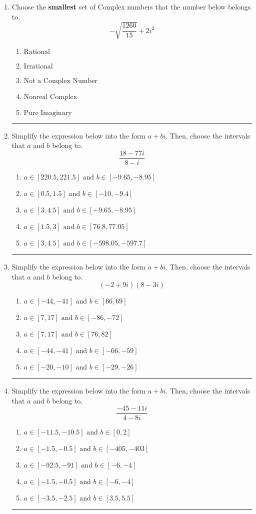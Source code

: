 \documentclass[14pt]{extbook}
\newcommand{\litem}[1]{\item#1\hspace*{-1cm}\rule{\textwidth}{0.4pt}}
\begin{document}
\begin{enumerate}
{\begin{enumerate}[label=\Alph*.]
\end{enumerate} }
\litem{
Choose the \textbf{smallest} set of Complex numbers that the number below belongs to.\[ -\sqrt{\frac{1260}{15}}+2i^2 \]\begin{enumerate}[label=\Alph*.]
\item \( \text{Rational} \)
\item \( \text{Irrational} \)
\item \( \text{Not a Complex Number} \)
\item \( \text{Nonreal Complex} \)
\item \( \text{Pure Imaginary} \)

\end{enumerate} }
\litem{
Simplify the expression below into the form $a+bi$. Then, choose the intervals that $a$ and $b$ belong to.\[ \frac{18 - 77 i}{8 - i} \]\begin{enumerate}[label=\Alph*.]
\item \( a \in [220.5, 221.5] \text{ and } b \in [-9.65, -8.95] \)
\item \( a \in [0.5, 1.5] \text{ and } b \in [-10, -9.4] \)
\item \( a \in [3, 4.5] \text{ and } b \in [-9.65, -8.95] \)
\item \( a \in [1.5, 3] \text{ and } b \in [76.8, 77.05] \)
\item \( a \in [3, 4.5] \text{ and } b \in [-598.05, -597.7] \)

\end{enumerate} }
\litem{
Simplify the expression below into the form $a+bi$. Then, choose the intervals that $a$ and $b$ belong to.\[ (-2 + 9 i)(8 - 3 i) \]\begin{enumerate}[label=\Alph*.]
\item \( a \in [-44, -41] \text{ and } b \in [66, 69] \)
\item \( a \in [7, 17] \text{ and } b \in [-86, -72] \)
\item \( a \in [7, 17] \text{ and } b \in [76, 82] \)
\item \( a \in [-44, -41] \text{ and } b \in [-66, -59] \)
\item \( a \in [-20, -10] \text{ and } b \in [-29, -26] \)

\end{enumerate} }
\litem{
Simplify the expression below into the form $a+bi$. Then, choose the intervals that $a$ and $b$ belong to.\[ \frac{-45 - 11 i}{4 - 8 i} \]\begin{enumerate}[label=\Alph*.]
\item \( a \in [-11.5, -10.5] \text{ and } b \in [0, 2] \)
\item \( a \in [-1.5, -0.5] \text{ and } b \in [-405, -403] \)
\item \( a \in [-92.5, -91] \text{ and } b \in [-6, -4] \)
\item \( a \in [-1.5, -0.5] \text{ and } b \in [-6, -4] \)
\item \( a \in [-3.5, -2.5] \text{ and } b \in [3.5, 5.5] \)


\end{enumerate}}
\end{enumerate}
\end{document}
